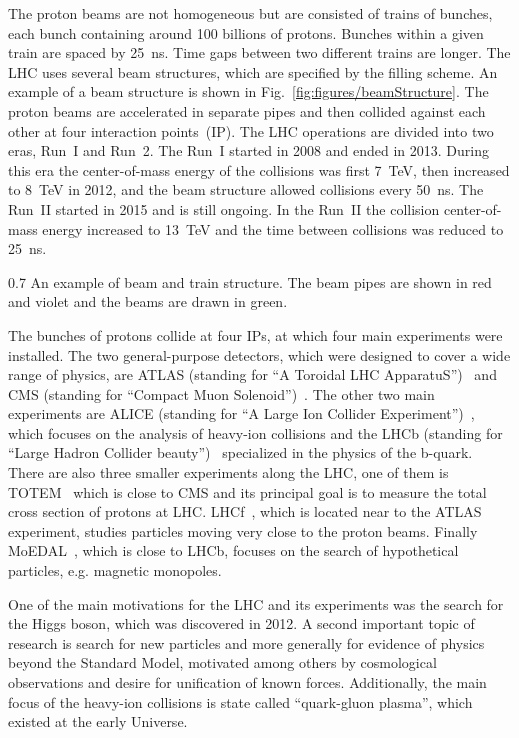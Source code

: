 The proton beams are not homogeneous but are consisted of trains of bunches, each bunch containing around 100 billions of protons. Bunches within a given train are spaced by 25~ns. Time gaps between two different trains are longer. The LHC uses several beam structures, which are specified by the filling scheme. An example of a beam structure is shown in Fig.~\ref{fig:figures/beamStructure}. The proton beams are accelerated in separate pipes and then collided against each other at four interaction points~(IP). The LHC operations are divided into two eras, Run~I and Run~2. The Run~I started in 2008 and ended in 2013. During this era the center-of-mass energy of the collisions was first 7~TeV, then increased to 8~TeV in 2012, and the beam structure allowed collisions every 50~ns. The Run~II started in 2015 and is still ongoing. In the Run~II the collision center-of-mass energy increased to 13~TeV and the time between collisions was reduced to 25~ns.

                 {0.7}       %
                 { An example of beam and train structure. The beam pipes are shown in red and violet and the beams are drawn in green. }

The bunches of protons collide at four IPs, at which four main experiments were installed. The two general-purpose detectors, which were designed to cover a wide range of physics, are ATLAS (standing for ``A Toroidal  LHC ApparatuS'')~\cite{Aad:2008zzm} and CMS (standing for ``Compact Muon Solenoid'')~\cite{Chatrchyan:2008aa}. The other two main experiments are ALICE (standing for ``A Large Ion Collider Experiment'')~\cite{Aamodt:2008zz}, which focuses on the analysis of heavy-ion collisions and the LHCb (standing for ``Large Hadron Collider beauty'')~\cite{Alves:2008zz} specialized in the physics of the b-quark. There are also three smaller experiments along the LHC, one of them is TOTEM~\cite{Anelli:2008zza} which is close to CMS and its principal goal is to measure the total cross section of protons at LHC. LHCf~\cite{Adriani:2008zz}, which is located near to the ATLAS experiment, studies particles moving very close to the proton beams. Finally MoEDAL~\cite{Acharya:2014nyr}, which is close to LHCb, focuses on the search of hypothetical particles, e.g. magnetic monopoles.

One of the main motivations for the LHC and its experiments was the search for the Higgs boson, which was discovered in 2012. A second important topic of research is search for new particles and more generally for evidence of physics beyond the Standard Model, motivated among others by cosmological observations and desire for unification of known forces. Additionally, the main focus of the  heavy-ion collisions is state called ``quark-gluon plasma'', which existed at the early Universe.

